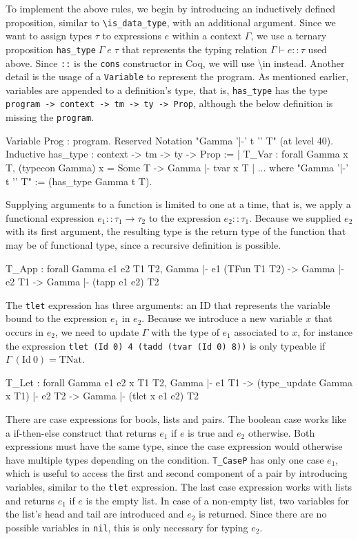 \documentclass[fleqn, abstract=on]{scrreprt}
\newcommand{\coqinline}[1]{\texttt{#1}}
\begin{document}
\par
To implement the above rules, we begin by introducing an inductively defined proposition, similar to \texttt{\textbackslash is\_data\_type}, with an additional argument. Since we want to assign types $\tau$ to expressions $e$ within a context $\Gamma$, we use a ternary proposition \coqinline{has_type}$\; \Gamma \; e \; \tau$ that represents the typing relation $\Gamma \vdash e :: \tau$ used above. Since \coqinline{::} is the \coqinline{cons} constructor in Coq, we will use \textbackslash in instead. Another detail is the usage of a \coqinline{Variable} to represent the program. As mentioned earlier, variables are appended to a definition's type, that is, \coqinline{has_type} has the type \coqinline{program -> context -> tm -> ty -> Prop}, although the below definition is missing the \coqinline{program}.
\begin{coqcode}
Variable Prog : program.
Reserved Notation "Gamma '|-' t '\in' T" (at level 40).
Inductive has_type : context -> tm -> ty -> Prop :=
  | T_Var : forall Gamma x T, (typecon Gamma) x = Some T ->
              Gamma |- tvar x \in T
  | ...
where "Gamma '|-' t '\in' T" := (has_type Gamma t T).
\end{coqcode}
Supplying arguments to a function is limited to one at a time, that is, we apply a functional expression $e_{1} :: \tau_{1} \rightarrow \tau_{2}$ to the expression $e_{2} :: \tau_{1}$. Because we supplied $e_{2}$ with its first argument, the resulting type is the return type of the function that may be of functional type, since a recursive definition is possible.
\begin{coqcode}
T_App : forall Gamma e1 e2 T1 T2,
          Gamma |- e1 \in (TFun T1 T2) -> Gamma |- e2 \in T1 ->
          Gamma |- (tapp e1 e2) \in T2
\end{coqcode}
The \coqinline{tlet} expression has three arguments: an ID that represents the variable bound to the expression $e_{1}$ in $e_{2}$. Because we introduce a new variable $x$ that occurs in $e_{2}$, we need to update $\Gamma$ with the type of $e_{1}$ associated to $x$, for instance the expression \coqinline{tlet (Id 0) 4 (tadd (tvar (Id 0) 8))} is only typeable if $\Gamma \:(\text{Id}\: 0) = \text{TNat}$.
\begin{coqcode}
T_Let : forall Gamma e1 e2 x T1 T2,
          Gamma |- e1 \in T1 -> (type_update Gamma x T1) |- e2 \in T2 ->
          Gamma |- (tlet x e1 e2) \in T2
\end{coqcode}
There are case expressions for bools, lists and pairs. The boolean case works like a if-then-else construct that returns $e_{1}$ if $e$ is true and $e_{2}$ otherwise. Both expressions must have the same type, since the case expression would otherwise have multiple types depending on the condition. \coqinline{T_CaseP} has only one case $e_{1}$, which is useful to access the first and second component of a pair by introducing variables, similar to the \coqinline{tlet} expression. The last case expression works with lists and returns $e_{1}$ if $e$ is the empty list. In case of a non-empty list, two variables for the list's head and tail are introduced and $e_{2}$ is returned. Since there are no possible variables in \coqinline{nil}, this is only necessary for typing $e_{2}$.
\end{document}
